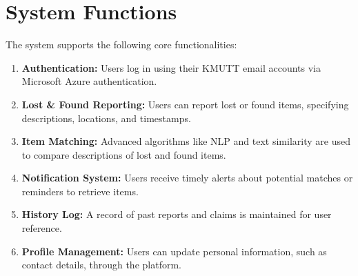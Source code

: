 \section{System Functions}
The system supports the following core functionalities:
\begin{enumerate}
    \item \textbf{Authentication:} Users log in using their KMUTT email accounts via Microsoft Azure authentication.
    \item \textbf{Lost \& Found Reporting:} Users can report lost or found items, specifying descriptions, locations, and timestamps.
    \item \textbf{Item Matching:} Advanced algorithms like NLP and text similarity are used to compare descriptions of lost and found items.
    \item \textbf{Notification System:} Users receive timely alerts about potential matches or reminders to retrieve items.
    \item \textbf{History Log:} A record of past reports and claims is maintained for user reference.
    \item \textbf{Profile Management:} Users can update personal information, such as contact details, through the platform.
\end{enumerate}
